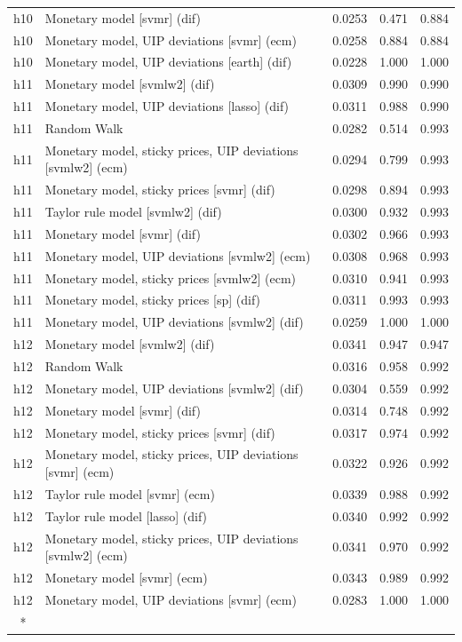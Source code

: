 \begin{ThreePartTable}
\begin{longtable}[t]{cp{5.5cm}ccc}
h10 & \raggedright Monetary model [svmr] (dif) & 0.0253 & 0.471 & 0.884\\
h10 & \raggedright Monetary model, UIP deviations [svmr] (ecm) & 0.0258 & 0.884 & 0.884\\
h10 & \raggedright Monetary model, UIP deviations [earth] (dif) & 0.0228 & 1.000 & 1.000\\
\addlinespace
h11 & \raggedright Monetary model [svmlw2] (dif) & 0.0309 & 0.990 & 0.990\\
h11 & \raggedright Monetary model, UIP deviations [lasso] (dif) & 0.0311 & 0.988 & 0.990\\
h11 & \raggedright Random Walk & 0.0282 & 0.514 & 0.993\\
h11 & \raggedright Monetary model, sticky prices, UIP deviations [svmlw2] (ecm) & 0.0294 & 0.799 & 0.993\\
h11 & \raggedright Monetary model, sticky prices [svmr] (dif) & 0.0298 & 0.894 & 0.993\\
h11 & \raggedright Taylor rule model [svmlw2] (dif) & 0.0300 & 0.932 & 0.993\\
h11 & \raggedright Monetary model [svmr] (dif) & 0.0302 & 0.966 & 0.993\\
h11 & \raggedright Monetary model, UIP deviations [svmlw2] (ecm) & 0.0308 & 0.968 & 0.993\\
h11 & \raggedright Monetary model, sticky prices [svmlw2] (ecm) & 0.0310 & 0.941 & 0.993\\
h11 & \raggedright Monetary model, sticky prices [sp] (dif) & 0.0311 & 0.993 & 0.993\\
h11 & \raggedright Monetary model, UIP deviations [svmlw2] (dif) & 0.0259 & 1.000 & 1.000\\
\addlinespace
h12 & \raggedright Monetary model [svmlw2] (dif) & 0.0341 & 0.947 & 0.947\\
h12 & \raggedright Random Walk & 0.0316 & 0.958 & 0.992\\
h12 & \raggedright Monetary model, UIP deviations [svmlw2] (dif) & 0.0304 & 0.559 & 0.992\\
h12 & \raggedright Monetary model [svmr] (dif) & 0.0314 & 0.748 & 0.992\\
h12 & \raggedright Monetary model, sticky prices [svmr] (dif) & 0.0317 & 0.974 & 0.992\\
h12 & \raggedright Monetary model, sticky prices, UIP deviations [svmr] (ecm) & 0.0322 & 0.926 & 0.992\\
h12 & \raggedright Taylor rule model [svmr] (ecm) & 0.0339 & 0.988 & 0.992\\
h12 & \raggedright Taylor rule model [lasso] (dif) & 0.0340 & 0.992 & 0.992\\
h12 & \raggedright Monetary model, sticky prices, UIP deviations [svmlw2] (ecm) & 0.0341 & 0.970 & 0.992\\
h12 & \raggedright Monetary model [svmr] (ecm) & 0.0343 & 0.989 & 0.992\\
h12 & \raggedright Monetary model, UIP deviations [svmr] (ecm) & 0.0283 & 1.000 & 1.000\\*
\end{longtable}
\end{ThreePartTable}
\endgroup{}
